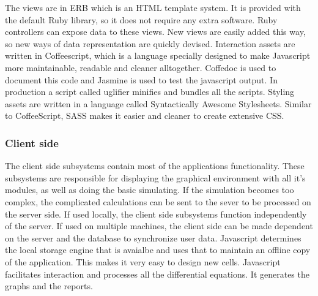 \documentclass{report}
\begin{document}
					The views are in ERB which is an HTML template system. It is provided with the default Ruby library, so it does not require any extra software. Ruby controllers can expose data to these views. New views are easily added this way, so new ways of data representation are quickly devised.
					Interaction assets are written in Coffeescript, which is a language specially designed to make Javascript more maintainable, readable and cleaner alltogether. Coffedoc is used to document this code and Jasmine is used to test the javascript output. In production a script called uglifier minifies and bundles all the scripts.
					Styling assets are written in a language called Syntactically Awesome Stylesheets. Similar to CoffeeScript, SASS makes it easier and cleaner to create extensive CSS. 
			\subsubsection{Client side}
				The client side subsystems contain most of the applications functionality. These subsystems are responsible for displaying the graphical environment with all it's modules, as well as doing the basic simulating. If the simulation becomes too complex, the complicated calculations can be sent to the sever to be processed on the server side. If used locally, the client side subsystems function independently of the server. If used on multiple machines, the client side can be made dependent on the server and the database to synchronize user data.
					Javascript determines the local storage engine that is avaialbe and uses that to maintain an offline copy of the application. This makes it very easy to design new cells. 
					Javascript facilitates interaction and processes all the differential equations. It generates the graphs and the reports. 
\end{document}
